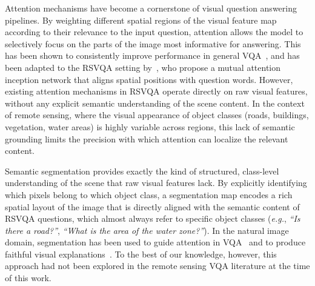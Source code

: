 Attention mechanisms have become a cornerstone of visual
question answering pipelines. By weighting different spatial
regions of the visual feature map according to their relevance
to the input question, attention allows the model to
selectively focus on the parts of the image most informative
for answering. This has been shown to consistently improve
performance in general VQA~\cite{zhang2020context,
wei2020multimodality}, and has been adapted to the RSVQA
setting by~\cite{zheng2021mutual}, who propose a mutual
attention inception network that aligns spatial positions
with question words. However, existing attention mechanisms
in RSVQA operate directly on raw visual features, without
any explicit semantic understanding of the scene content.
In the context of remote sensing, where the visual appearance
of object classes (roads, buildings, vegetation, water areas)
is highly variable across regions, this lack
of semantic grounding limits the precision with which
attention can localize the relevant content.

Semantic segmentation provides exactly the kind of
structured, class-level understanding of the scene that
raw visual features lack. By explicitly identifying which
pixels belong to which object class, a segmentation map
encodes a rich spatial layout of the image that is directly
aligned with the semantic content of RSVQA questions,
which almost always refer to specific object classes
(\textit{e.g.}, \textit{``Is there a road?''}, \textit{``What
is the area of the water zone?''}). In the natural image
domain, segmentation has been used to guide attention in
VQA~\cite{gan2017vqs} and to produce faithful visual
explanations~\cite{wu2018faithful}. To the best of our
knowledge, however, this approach had not been explored in
the remote sensing VQA literature at the time of this work.

